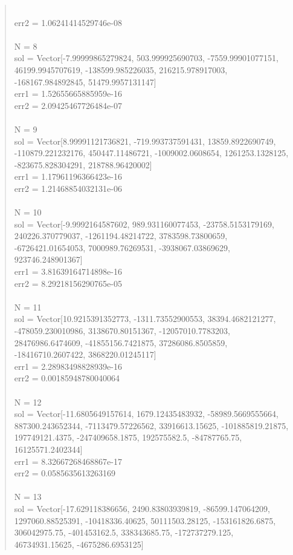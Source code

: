 \documentclass[letterpaper,12pt]{article}
\begin{document}
\begin{quote}
\\err2 = 1.06241414529746e-08
\\
\\N = 8
\\sol = Vector[-7.99999865279824, 503.999925690703, -7559.99901077151, 46199.9945707619, -138599.985226035, 216215.978917003, -168167.984892845, 51479.9957131147]
\\err1 = 1.52655665885959e-16
\\err2 = 2.09425467726484e-07
\\
\\N = 9
\\sol = Vector[8.99991121736821, -719.993737591431, 13859.8922690749, -110879.221232176, 450447.11486721, -1009002.0608654, 1261253.1328125, -823675.828304291, 218788.96420002]
\\err1 = 1.17961196366423e-16
\\err2 = 1.21468854032131e-06
\\
\\N = 10
\\sol = Vector[-9.9992164587602, 989.931160077453, -23758.5153179169, 240226.370779037, -1261194.48214722, 3783598.73800659, -6726421.01654053, 7000989.76269531, -3938067.03869629, 923746.248901367]
\\err1 = 3.81639164714898e-16
\\err2 = 8.29218156290765e-05
\\
\\N = 11
\\sol = Vector[10.9215391352773, -1311.73552900553, 38394.4682121277, -478059.230010986, 3138670.80151367, -12057010.7783203, 28476986.6474609, -41855156.7421875, 37286086.8505859, -18416710.2607422, 3868220.01245117]
\\err1 = 2.28983498828939e-16
\\err2 = 0.00185948780040064
\\
\\N = 12
\\sol = Vector[-11.6805649157614, 1679.12435483932, -58989.5669555664, 887300.243652344, -7113479.57226562, 33916613.15625, -101885819.21875, 197749121.4375, -247409658.1875, 192575582.5, -84787765.75, 16125571.2402344]
\\err1 = 8.32667268468867e-17
\\err2 = 0.0585635613263169
\\
\\N = 13
\\sol = Vector[-17.629118386656, 2490.83803939819, -86599.147064209, 1297060.88525391, -10418336.40625, 50111503.28125, -153161826.6875, 306042975.75, -401453162.5, 338343685.75, -172737279.125, 46734931.15625, -4675286.6953125]

\end{quote}
\end{document}
